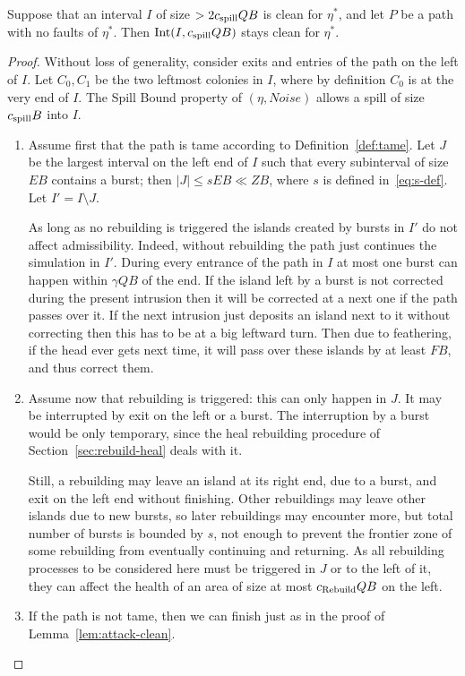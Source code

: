 \documentclass[11pt]{memoir}
\theoremstyle{definition} %
\renewcommand{\le}{\leq}
\def\B{B}
\newcommand{\E}{E} %
\newcommand{\F}{F}
\newcommand{\Int}{\mathrm{Int}} %
\newcommand{\Noise}{\mathit{Noise}}
\newcommand{\Q}{Q} %
\newcommand{\s}{s} %
\newcommand{\Z}{Z} %
\newcommand{\cns}[1]{c_{\textrm{\upshape #1}}}
\newcommand{\CRebuild}{\cns{Rebuild}}
\newcommand{\CSpill}{\cns{spill}}
\begin{document}
\begin{lemma}\label{lem:spill-bound}
Suppose that an interval \( I \) of size \( > 2\CSpill\Q\B \) is clean for \( \eta^{*} \), and
let \( P \) be a path with no faults of \( \eta^{*} \).
Then \( \Int(I,\CSpill\Q\B) \) stays clean for \( \eta^{*} \).
\end{lemma}
\begin{proof}
  Without loss of generality, consider exits and entries of the path on the left of \( I \).
  Let \( C_{0},C_{1}\) be the two leftmost colonies in \( I \), where
  by definition \( C_{0} \) is at the very end of \( I \).
  The Spill Bound property of \( (\eta,\Noise) \) allows a spill of size \( \CSpill\B \) into \( I \).

  \begin{enumerate}
  \item 
    Assume first that the path is tame according to Definition~\ref{def:tame}.
  Let \( J \) be the largest interval on the left end of \( I \) such that every subinterval
  of size \( \E\B \) contains a burst; then \( |J|\le \s\E\B\ll\Z\B \), where \( \s \) is defined
  in~\eqref{eq:s-def}.
  Let \( I'=I\setminus J \).

  As long as no rebuilding is triggered 
  the islands created by bursts in \( I' \) do not affect admissibility.
  Indeed, without rebuilding the path just continues the simulation in \( I' \).
  During every entrance of the path in \( I \) at most one burst can happen within
  \( \gamma\Q\B \) of the end.
  If the island left by a burst is not corrected during the present intrusion then
  it will be corrected at a next one if the path passes over it.
  If the next intrusion just deposits an island next to it without correcting then this
  has to be at a big leftward turn.
  Then due to feathering, if the head ever gets next time,
  it will pass over these islands by at least \( \F\B \), and thus correct them.

\item Assume now that rebuilding is triggered: this can only happen in \( J \).
  It may be interrupted by exit on the left or a burst.
  The interruption by a burst would be only temporary, since the heal rebuilding procedure
  of Section~\ref{sec:rebuild-heal} deals with it.
  
  Still, a rebuilding may leave an island at its right end, due to a burst, and exit on the
  left end without finishing.
  Other rebuildings may leave other islands due to new bursts,
  so later rebuildings may encounter more, but total number of bursts is bounded by \( \s \),
  not enough to prevent the frontier zone of some rebuilding from eventually continuing and 
  returning.
  As all rebuilding processes to be considered here must be triggered in \( J \) or to the left of it,
  they can affect the health of an area of size at most \( \CRebuild\Q\B \) on the left.

\item If the path is not tame,
  then we can finish just as in the proof of Lemma~\ref{lem:attack-clean}.
  \end{enumerate}
\end{proof}
\end{document}

